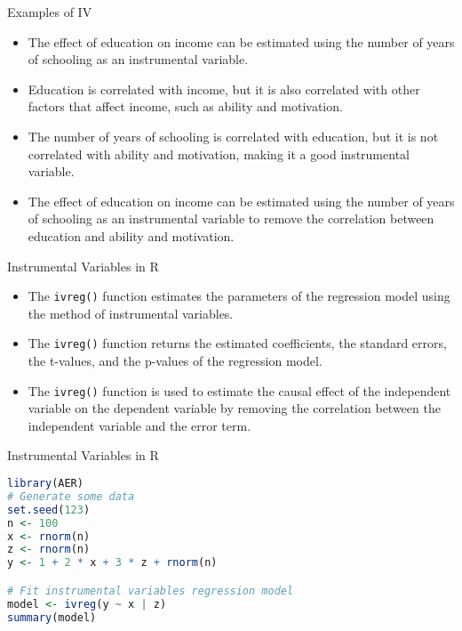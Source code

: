 \documentclass[serif, 9pt, aspectratio=32]{beamer}
\begin{document}
\begin{frame}{Examples of IV}
    \begin{itemize}
        \setlength{\itemsep}{2em}
        \item The effect of education on income can be estimated using the number of years of schooling as an instrumental variable.
        \item Education is correlated with income, but it is also correlated with other factors that affect income, such as ability and motivation.
        \item The number of years of schooling is correlated with education, but it is not correlated with ability and motivation, making it a good instrumental variable.
        \item The effect of education on income can be estimated using the number of years of schooling as an instrumental variable to remove the correlation between education and ability and motivation.
    \end{itemize}
\end{frame}

\begin{frame}{Instrumental Variables in R}
    \begin{itemize}
        \setlength{\itemsep}{2em}
        \item The \texttt{ivreg()} function estimates the parameters of the regression model using the method of instrumental variables.
        \item The \texttt{ivreg()} function returns the estimated coefficients, the standard errors, the t-values, and the p-values of the regression model.
        \item The \texttt{ivreg()} function is used to estimate the causal effect of the independent variable on the dependent variable by removing the correlation between the independent variable and the error term.
    \end{itemize}
\end{frame}

\begin{frame}[fragile]{Instrumental Variables in R}
    \begin{lstlisting}[language=R]
library(AER)
# Generate some data 
set.seed(123)
n <- 100
x <- rnorm(n)
z <- rnorm(n)
y <- 1 + 2 * x + 3 * z + rnorm(n)

# Fit instrumental variables regression model
model <- ivreg(y ~ x | z)
summary(model)
    \end{lstlisting}
\end{frame}
\end{document}
